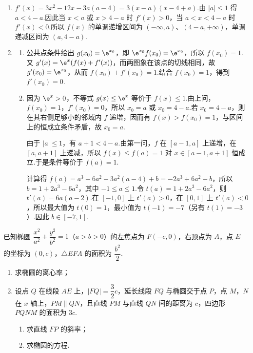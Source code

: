 \begin{solution}
\begin{enumerate}
\item \(f'(x)=3x^2-12x-3a(a-4)=3(x-a)(x-4+a)\).由 \(|a|\le1\) 得 \(a<4-a\).因此当 \(x<a\) 或 \(x>4-a\) 时 \(f'(x)>0\)，当 \(a<x<4-a\) 时 \(f'(x)<0\).所以 \(f(x)\) 的单调递增区间为 \((-\infty,a)\)、\((4-a,+\infty)\)，单调递减区间为 \((a,4-a)\).

\item
\begin{enumerate}
\item 公共点条件给出 \(g(x_0)=\e^{x_0}\)，即 \(\e^{x_0}f(x_0)=\e^{x_0}\)，所以 \(f(x_0)=1\).又 \(g'(x)=\e^x(f(x)+f'(x))\)，而两图象在该点的切线相同，故 \(g'(x_0)=\e^{x_0}\)，从而 \(f(x_0)+f'(x_0)=1\).结合 \(f(x_0)=1\)，得到 \(f'(x_0)=0\).

\item 因为 \(\e^x>0\)，不等式 \(g(x)\le\e^x\) 等价于 \(f(x)\le1\).由上问，\(f(x_0)=1\)，\(f'(x_0)=0\)，所以 \(x_0=a\) 或 \(x_0=4-a\).若 \(x_0=4-a\)，则在其右侧足够小的邻域内 \(f\) 递增，因而有 \(f(x)>f(x_0)=1\)，与区间上的恒成立条件矛盾，故 \(x_0=a\).

由于 \(|a|\le1\)，有 \(a+1<4-a\).由第一问，\(f\) 在 \([a-1,a]\) 上递增，在 \([a,a+1]\) 上递减，所以 \(f(x)\le f(a)=1\) 对 \(x\in[a-1,a+1]\) 恒成立.于是条件等价于 \(f(a)=1\).

计算得 \(f(a)=a^3-6a^2-3a^2(a-4)+b=-2a^3+6a^2+b\)，所以 \(b=1+2a^3-6a^2\)，其中 \(-1\le a\le1\).令 \(t(a)=1+2a^3-6a^2\)，则 \(t'(a)=6a(a-2)\).在 \([-1,0]\) 上 \(t'(a)>0\)，在 \([0,1]\) 上 \(t'(a)<0\)，所以最大值为 \(t(0)=1\)，最小值为 \(t(-1)=-7\)（另有 \(t(1)=-3\)）.因此 \(b\in[-7,1]\).
\end{enumerate}
\end{enumerate}
\end{solution}

\begin{problem}
已知椭圆 \(\dfrac{x^2}{a^2}+\dfrac{y^2}{b^2}=1\)（\(a>b>0\)）的左焦点为 \(F(-c,0)\)，右顶点为 \(A\)，点 \(E\) 的坐标为 \((0,c)\)，\(\triangle EFA\) 的面积为 \(\dfrac{b^2}{2}\).

\begin{enumerate}
\item 求椭圆的离心率；
\item 设点 \(Q\) 在线段 \(AE\) 上，\(|FQ|=\dfrac32c\)，延长线段 \(FQ\) 与椭圆交于点 \(P\)，点 \(M\)，\(N\) 在 \(x\) 轴上，\(PM\parallel QN\)，且直线 \(PM\) 与直线 \(QN\) 间的距离为 \(c\)，四边形 \(PQNM\) 的面积为 \(3c\).
\begin{enumerate}
\item 求直线 \(FP\) 的斜率；
\item 求椭圆的方程.
\end{enumerate}
\end{enumerate}
\end{problem}

